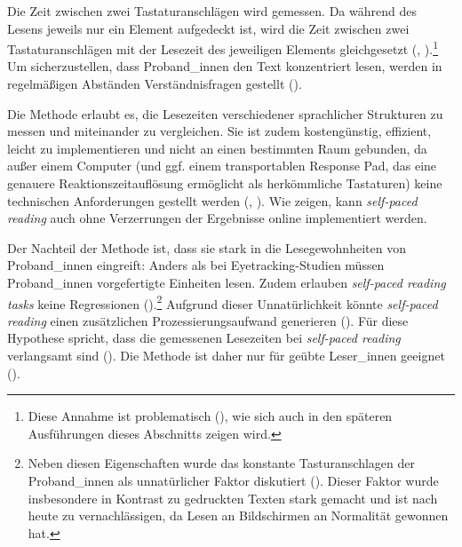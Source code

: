 Die Zeit zwischen zwei Tastaturanschlägen wird gemessen. Da während des Lesens jeweils nur ein Element aufgedeckt ist, wird die Zeit zwischen zwei Tastaturanschlägen mit der Lesezeit des jeweiligen Elements gleichgesetzt (\cite[118]{McDonough.2012}, \cite[21--22]{Jegerski.2014}).\footnote{Diese Annahme ist problematisch (\cite[349]{Forster.2010}), wie sich auch in den späteren Ausführungen dieses Abschnitts zeigen wird.} Um sicherzustellen, dass Proband\_innen den Text konzentriert lesen, werden in regelmäßigen Abständen Verständnisfragen gestellt (\cite[349]{Forster.2010}). 

Die Methode erlaubt es, die Lesezeiten verschiedener sprachlicher Strukturen zu messen und miteinander zu vergleichen. Sie ist zudem kostengünstig, effizient, leicht zu implementieren und nicht an einen bestimmten Raum gebunden, da außer einem Computer (und ggf. einem transportablen Response Pad, das eine genauere Reaktionszeitauflösung ermöglicht als herkömmliche Tastaturen) keine technischen Anforderungen gestellt werden (\cite[24]{Mitchel.2013}, \cite[43]{Jegerski.2014}). Wie \textcite{Keller.2009} zeigen, kann \textit{self-paced reading} auch ohne Verzerrungen der Ergebnisse online implementiert werden. 



Der Nachteil der Methode ist, dass sie stark in die Lesegewohnheiten von Proband\_innen eingreift: Anders als bei Eyetracking-Studien müssen Proband\_innen vorgefertigte Einheiten lesen. Zudem erlauben \textit{self-paced reading tasks} keine Regressionen (\cite[44]{Jegerski.2014}).\footnote{Neben diesen Eigenschaften wurde das konstante Tasturanschlagen der Proband\_innen als unnatürlicher Faktor diskutiert (\cite[44]{Jegerski.2014}). Dieser Faktor wurde insbesondere in Kontrast zu gedruckten Texten stark gemacht und ist nach \textcite[44]{Jegerski.2014} heute zu vernachlässigen, da Lesen an Bildschirmen an Normalität gewonnen hat.}  Aufgrund dieser Unnatürlichkeit könnte \textit{self-paced reading} einen zusätzlichen Prozessierungsaufwand generieren (\cite[44]{Jegerski.2014}). Für diese Hypothese spricht, dass die gemessenen Lesezeiten bei \textit{self-paced reading} verlangsamt sind (\cite[25]{Mitchel.2013}). Die Methode ist daher nur für geübte Leser\_innen geeignet (\cite[43]{Jegerski.2014}).

